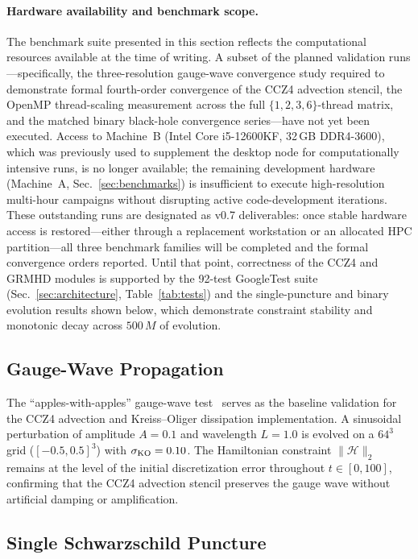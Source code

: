 \documentclass[aps,prd,twocolumn,superscriptaddress,nofootinbib,showpacs,
               longbibliography]{revtex4-2}
\newcommand{\norm}[1]{\|#1\|}
\begin{document}
\paragraph{Hardware availability and benchmark scope.}
The benchmark suite presented in this section reflects the computational
resources available at the time of writing.
A subset of the planned validation runs---specifically, the three-resolution
gauge-wave convergence study required to demonstrate formal fourth-order
convergence of the CCZ4 advection stencil, the OpenMP thread-scaling
measurement across the full $\{1,2,3,6\}$-thread matrix, and the matched
binary black-hole convergence series---have not yet been executed.
Access to Machine~B (Intel Core i5-12600KF, 32\,GB DDR4-3600), which was
previously used to supplement the desktop node for computationally intensive
runs, is no longer available; the remaining development hardware (Machine~A,
Sec.~\ref{sec:benchmarks}) is insufficient to execute high-resolution
multi-hour campaigns without disrupting active code-development iterations.
These outstanding runs are designated as v0.7 deliverables: once stable
hardware access is restored---either through a replacement workstation or
an allocated HPC partition---all three benchmark families will be completed
and the formal convergence orders reported.
Until that point, correctness of the CCZ4 and GRMHD modules is supported
by the 92-test GoogleTest suite (Sec.~\ref{sec:architecture}, Table~\ref{tab:tests}) and the
single-puncture and binary evolution results shown below, which demonstrate
constraint stability and monotonic decay across $500\,M$ of evolution.

\subsection{Gauge-Wave Propagation}
\label{sec:gw_bench}

The ``apples-with-apples'' gauge-wave test~\cite{Alcubierre2008} serves as
the baseline validation for the CCZ4 advection and Kreiss--Oliger
dissipation implementation.
A sinusoidal perturbation of amplitude $A = 0.1$ and wavelength $L = 1.0$
is evolved on a $64^3$ grid ($[-0.5, 0.5]^3$) with $\sigma_{\rm KO} = 0.10$.
The Hamiltonian constraint $\norm{\mathcal{H}}_2$ remains at the level of
the initial discretization error throughout $t \in [0, 100]$, confirming
that the CCZ4 advection stencil preserves the gauge wave without artificial
damping or amplification.

\subsection{Single Schwarzschild Puncture}
\label{sec:sp_bench}
\end{document}
